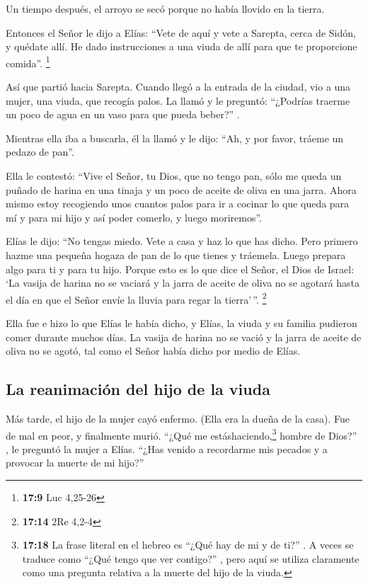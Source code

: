  Un tiempo después, el arroyo se secó porque no había
llovido en la tierra.

 Entonces el Señor le dijo a Elías:  ``Vete
de aquí y vete a Sarepta, cerca de Sidón, y quédate allí. He dado
instrucciones a una viuda de allí para que te proporcione comida''.
\footnote{\textbf{17:9} Luc 4,25-26}

 Así que partió hacia Sarepta. Cuando llegó a la entrada
de la ciudad, vio a una mujer, una viuda, que recogía palos. La llamó y
le preguntó: ``¿Podrías traerme un poco de agua en un vaso para que
pueda beber?'' .

 Mientras ella iba a buscarla, él la llamó y le dijo:
``Ah, y por favor, tráeme un pedazo de pan''.

 Ella le contestó: ``Vive el Señor, tu Dios, que no tengo
pan, sólo me queda un puñado de harina en una tinaja y un poco de aceite
de oliva en una jarra. Ahora mismo estoy recogiendo unos cuantos palos
para ir a cocinar lo que queda para mí y para mi hijo y así poder
comerlo, y luego moriremos''.

 Elías le dijo: ``No tengas miedo. Vete a casa y haz lo
que has dicho. Pero primero hazme una pequeña hogaza de pan de lo que
tienes y tráemela. Luego prepara algo para ti y para tu hijo.
 Porque esto es lo que dice el Señor, el Dios de Israel:
`La vasija de harina no se vaciará y la jarra de aceite de oliva no se
agotará hasta el día en que el Señor envíe la lluvia para regar la
tierra'\,''. \footnote{\textbf{17:14} 2Re 4,2-4}

 Ella fue e hizo lo que Elías le había dicho, y Elías, la
viuda y su familia pudieron comer durante muchos días. 
La vasija de harina no se vació y la jarra de aceite de oliva no se
agotó, tal como el Señor había dicho por medio de Elías.

\hypertarget{la-reanimaciuxf3n-del-hijo-de-la-viuda}{%
\subsection{La reanimación del hijo de la
viuda}\label{la-reanimaciuxf3n-del-hijo-de-la-viuda}}

 Más tarde, el hijo de la mujer cayó enfermo. (Ella era
la dueña de la casa). Fue de mal en peor, y finalmente murió.
 ``¿Qué me estáshaciendo,\footnote{\textbf{17:18} La
  frase literal en el hebreo es ``¿Qué hay de mi y de ti?'' . A veces se
  traduce como ``¿Qué tengo que ver contigo?'' , pero aquí se utiliza
  claramente como una pregunta relativa a la muerte del hijo de la
  viuda.} hombre de Dios?'' , le preguntó la mujer a Elías. ``¿Has
venido a recordarme mis pecados y a provocar la muerte de mi hijo?''

